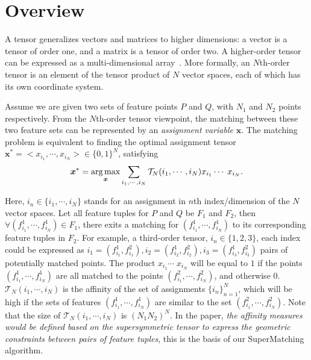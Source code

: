 \section{Overview}
\label{sec:overview}

A tensor generalizes vectors and matrices to higher dimensions: a vector is a tensor of order one,
and a matrix is a tensor of order two. A higher-order tensor can be expressed as a multi-dimensional array~\cite{Kolda08}.
More formally, an $N$th-order tensor is an element of the tensor product of $N$ vector spaces, each of which has its own coordinate system.

Assume we are given two sets of feature points $P$ and $Q$, with $N_1$ and $N_2$ points respectively.
From the $N$th-order tensor viewpoint, the matching between these two feature sets can be represented by an \emph{assignment variable} $\boldsymbol{x}$.
The matching problem is equivalent to finding the optimal assignment tensor ${\boldsymbol{x}}^*=<x_{i_1},\cdots,x_{i_N}>
 \in \{0,1\}^{N}$, satisfying~\cite{Kolda08,Duchenne09}
\begin{equation}
\label{equ:assigment}
  {\boldsymbol{x}}^* = \operatorname*{arg\,max}_{\boldsymbol{x}}  \sum_{i_1,\cdots,i_N} \mathcal{T}_N(i_1,\cdots,i_N) x_{i_1}  \cdots\; x_{i_N}.
\end{equation}

Here, $i_n \in \{i_1,\cdots ,i_N\}$ stands for an assignment in $n$th index/dimension of the $N$ vector spaces.
Let all feature tuples for $P$ and $Q$ be $F_1$ and $F_2$, then $\forall (f_{i_1}^1, \cdots, f_{i_N}^1)\in F_1$,
there exits a matching for $(f_{i_1}^1, \cdots, f_{i_N}^1)$ to its corresponding feature tuples in $F_2$.
For example, a third-order tensor, $i_n \in \{1,2,3\}$, 
each index could be expressed as $i_1=(f_{i_1}^1,f_{i_1}^2), i_2=(f_{i_2}^1,f_{i_2}^2), i_3=(f_{i_3}^1,f_{i_3}^2)$ pairs of potentially matched points.
The product $x_{i_1} \cdots\;x_{i_N}$ will be equal to $1$ if the points $(f_{i_1}^1, \cdots, f_{i_N}^1)$ are all matched to the points $(f_{i_1}^2, \cdots, f_{i_N}^2)$, 
and otherwise 0.
$\mathcal{T}_N(i_1,\cdots,i_N)$ is the affinity of the set of assignments $\{i_n\}_{n=1}^N$, 
which will be high if the sets of features $(f_{i_1}^1, \cdots, f_{i_N}^1)$  are similar to the set $(f_{i_1}^2, \cdots, f_{i_N}^2)$.
Note that the size of $\mathcal{T}_N(i_1,\cdots,i_N)$ is ${(N_1N_2)}^N$.
In the paper, \emph{the affinity measures would be defined based on the supersymmetric tensor to express the geometric constraints between pairs of feature tuples},
this is the basis of our SuperMatching algorithm.

